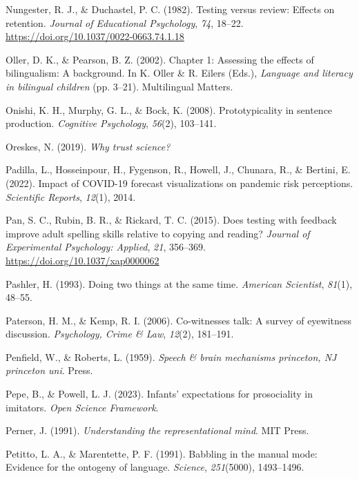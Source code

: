 \documentclass[
]{krantz}
\newlength{\cslhangindent}
\newenvironment{CSLReferences}[2] %
 {\begin{list}{}{%
  \setlength{\itemindent}{0pt}
  \setlength{\leftmargin}{0pt}
  \setlength{\parsep}{0pt}
  \ifodd #1
   \setlength{\leftmargin}{\cslhangindent}
   \setlength{\itemindent}{-1\cslhangindent}
  \fi
  \setlength{\itemsep}{#2\baselineskip}}}
 {\end{list}}
\begin{document}
\begin{CSLReferences}{1}{0}
Nungester, R. J., \& Duchastel, P. C. (1982). Testing versus review: Effects on retention. \emph{Journal of Educational Psychology}, \emph{74}, 18--22. \url{https://doi.org/10.1037/0022-0663.74.1.18}

Oller, D. K., \& Pearson, B. Z. (2002). Chapter 1: Assessing the effects of bilingualism: A background. In K. Oller \& R. Eilers (Eds.), \emph{Language and literacy in bilingual children} (pp. 3--21). Multilingual Matters.

Onishi, K. H., Murphy, G. L., \& Bock, K. (2008). Prototypicality in sentence production. \emph{Cognitive Psychology}, \emph{56}(2), 103--141.

Oreskes, N. (2019). \emph{Why trust science?}

Padilla, L., Hosseinpour, H., Fygenson, R., Howell, J., Chunara, R., \& Bertini, E. (2022). Impact of COVID-19 forecast visualizations on pandemic risk perceptions. \emph{Scientific Reports}, \emph{12}(1), 2014.

Pan, S. C., Rubin, B. R., \& Rickard, T. C. (2015). Does testing with feedback improve adult spelling skills relative to copying and reading? \emph{Journal of Experimental Psychology: Applied}, \emph{21}, 356--369. \url{https://doi.org/10.1037/xap0000062}

Pashler, H. (1993). Doing two things at the same time. \emph{American Scientist}, \emph{81}(1), 48--55.

Paterson, H. M., \& Kemp, R. I. (2006). Co-witnesses talk: A survey of eyewitness discussion. \emph{Psychology, Crime \& Law}, \emph{12}(2), 181--191.

Penfield, W., \& Roberts, L. (1959). \emph{Speech \& brain mechanisms princeton, NJ princeton uni}. Press.

Pepe, B., \& Powell, L. J. (2023). Infants' expectations for prosociality in imitators. \emph{Open Science Framework}.

Perner, J. (1991). \emph{Understanding the representational mind}. MIT Press.

Petitto, L. A., \& Marentette, P. F. (1991). Babbling in the manual mode: Evidence for the ontogeny of language. \emph{Science}, \emph{251}(5000), 1493--1496.


\end{CSLReferences}
\end{document}
